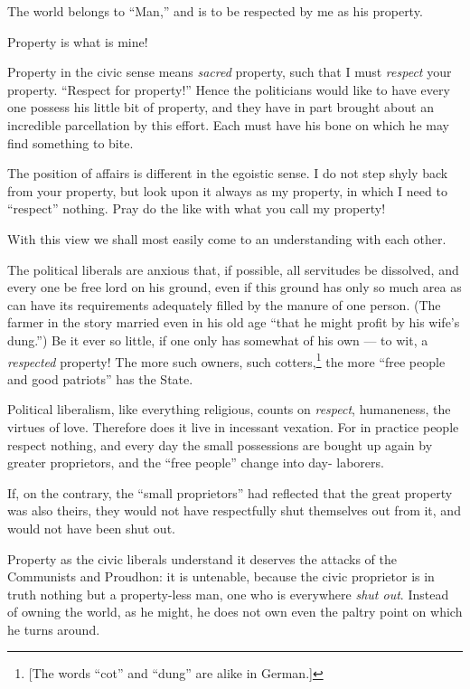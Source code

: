 The world belongs to ``Man,'' and is to be respected by me as his property.

Property is what is mine!

Property in the civic sense means \textit{sacred} property, such that I must 
\textit{respect} your property. ``Respect for property!'' Hence the 
politicians would like to have every one possess his little bit of property, 
and they have in part brought about an incredible parcellation by this effort. 
Each must have his bone on which he may find something to bite.

The position of affairs is different in the egoistic sense. I do not step 
shyly back from your property, but look upon it always as my property, in 
which I need to ``respect'' nothing. Pray do the like with what you call my 
property!

With this view we shall most easily come to an understanding with each other.

The political liberals are anxious that, if possible, all servitudes be 
dissolved, and every one be free lord on his ground, even if this ground has 
only so much area as can have its requirements adequately filled by the manure 
of one person. (The farmer in the story married even in his old age ``that he 
might profit by his wife's dung.'') Be it ever so little, if one only has 
somewhat of his own --- to wit, a \textit{respected} property! The more such 
owners, such cotters,\footnote{[The words ``cot'' and ``dung'' are alike 
in German.]} the more ``free people and good patriots'' has the State.

Political liberalism, like everything religious, counts on \textit{respect}, 
humaneness, the virtues of love. Therefore does it live in incessant vexation. 
For in practice people respect nothing, and every day the small possessions 
are bought up again by greater proprietors, and the ``free people'' change 
into day- laborers.

If, on the contrary, the ``small proprietors'' had reflected that the great 
property was also theirs, they would not have respectfully shut themselves out 
from it, and would not have been shut out.

Property as the civic liberals understand it deserves the attacks of the 
Communists and Proudhon: it is untenable, because the civic proprietor is in 
truth nothing but a property-less man, one who is everywhere \textit{shut 
out}. Instead of owning the world, as he might, he does not own even the 
paltry point on which he turns around.

